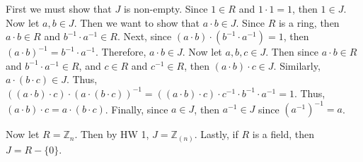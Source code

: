 \documentclass{article}
\makeatletter
\theoremstyle{definition}
\theoremstyle{remark}
\let\oldproofname=\proofname
\renewcommand{\proofname}{\bf{\textit{\oldproofname}}}
\theoremstyle{definition}
\renewenvironment{proof*}[1][\proofname]{\par
  \pushQED{\qed}%
  \normalfont \topsep6\p@\@plus6\p@\relax
  \list{}{\leftmargin=0mm
          \rightmargin=0mm
          \settowidth{\itemindent}{\itshape#1}%
          \labelwidth=\itemindent
          \parsep=0pt \listparindent=0mm%
  }
  \item[\hskip\labelsep
        \itshape
    #1\@addpunct{.}]\ignorespaces
}{%
  \popQED\endlist\@endpefalse
}
\makeatother
\begin{document}
\begin{enumerate}[leftmargin=*]
            \begin{proof*}
                First we must show that $J$ is non-empty. Since $1\in R$ and $1\cdot 1=1$, then $1\in J$. Now let $a,b\in J$. Then we want to show that $a\cdot b\in J$. Since $R$ is a ring, then $a\cdot b\in R$ and $b^{-1}\cdot a^{-1}\in R$. Next, since $(a\cdot b)\cdot(b^{-1}\cdot a^{-1})=1$, then $(a\cdot b)^{-1}=b^{-1}\cdot a^{-1}$. Therefore, $a\cdot b\in J$. Now let $a,b,c\in J$. Then since $a\cdot b\in R$ and $b^{-1}\cdot a^{-1}\in R$, and $c\in R$ and $c^{-1}\in R$, then $(a\cdot b)\cdot c\in J$. Similarly, $a\cdot(b\cdot c)\in J$. Thus, $((a\cdot b)\cdot c)\cdot(a\cdot(b\cdot c))^{-1}=((a\cdot b)\cdot c)\cdot c^{-1}\cdot b^{-1}\cdot a^{-1}=1$. Thus, $(a\cdot b)\cdot c=a\cdot(b\cdot c)$. Finally, since $a\in J$, then $a^{-1}\in J$ since $(a^{-1})^{-1}=a$.\par\hspace{4mm} Now let $R=\mathbb{Z}_n$. Then by HW 1, $J=\mathbb{Z}_{(n)}$. Lastly, if $R$ is a field, then $J=R-\{0\}$.
            \end{proof*}   
    \end{enumerate}    
\end{document}
